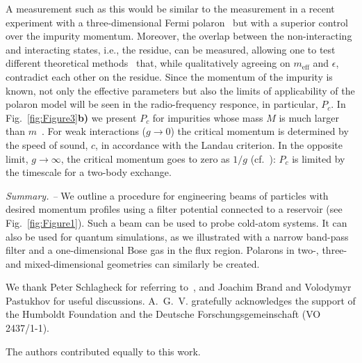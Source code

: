 \documentclass[reprint, twocolumn,amsmath,amssymb,showpacs,pra,superscriptaddress,aps]{revtex4-1}
\begin{document}
A measurement such as this would be similar to the measurement in a recent experiment with a three-dimensional Fermi polaron~\cite{zaccanti2017} but 
with a superior control over the impurity momentum. 
Moreover, the overlap between the non-interacting and interacting states, i.e., the residue, can
be measured, allowing one to test different theoretical methods~\cite{volosniev2017, pastukhov2017,grusdt2017,pastukhov2018}
that, while qualitatively agreeing on $m_{\mathrm{eff}}$ and $\epsilon$, contradict each other on the residue.
Since the momentum of the impurity is known, not only the effective parameters but also the limits of applicability 
of the polaron model will be seen in the radio-frequency responce, in particular, $P_c$.
In Fig.~\ref{fig:Figure3}{\bf b)} we present $P_c$ for impurities whose mass $M$ is much larger than $m$~\cite{hakim1997}.
For weak interactions ($g\to 0$) the critical momentum is determined by the speed of sound, $c$, in accordance with the Landau criterion.
In the opposite limit, $g\to \infty$, the critical momentum goes to zero as $1/g$ (cf.~\cite{kamenev2016}):   
$P_c$ is limited by the timescale for a two-body exchange. 
 



{\it Summary. --}  We outline a procedure for engineering beams of particles with desired momentum profiles using a filter potential connected to a reservoir (see Fig.~\ref{fig:Figure1}). Such a beam can be used to probe cold-atom systems. It can also be used for quantum simulations, as we illustrated with a narrow band-pass filter and a one-dimensional Bose gas in the flux region. Polarons in two-, three- and mixed-dimensional geometries can similarly be created. 

\vspace*{1em}


\begin{acknowledgments}
We thank Peter Schlagheck for referring to~\cite{Schlagheck2005},
and Joachim Brand and Volodymyr Pastukhov for useful discussions.
A.~G.~V. gratefully acknowledges the support of the Humboldt Foundation and the Deutsche Forschungsgemeinschaft
(VO 2437/1-1).

\vspace*{1em}

The authors contributed equally to this work.
\end{acknowledgments}





\end{document}
